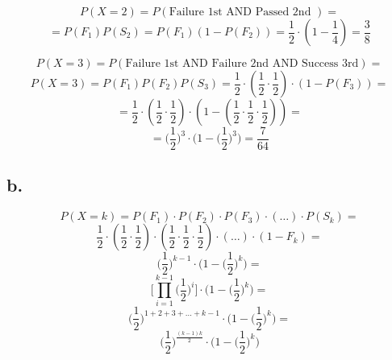 \documentclass{article}
\begin{document}
\begin{equation*}
    P(X = 2) = P(\mbox{Failure 1st AND Passed 2nd }) =
\end{equation*}
\begin{equation*}
    = P(F_{1})P(S_{2}) = P(F_{1})(1 - P(F_{2})) = \frac{1}{2} \cdot (1 - \frac{1}{4}) = \frac{3}{8}
\end{equation*}

\begin{equation*}
    P(X = 3) = P(\mbox{Failure 1st AND Failure 2nd AND Success 3rd}) =
\end{equation*}
\begin{equation*}
    P(X = 3) = P(F_{1})P(F_{2})P(S_{3}) = \frac{1}{2} \cdot (\frac{1}{2} \cdot \frac{1}{2}) \cdot (1 - P(F_{3})) =
\end{equation*}
\begin{equation*}
    = \frac{1}{2} \cdot (\frac{1}{2} \cdot \frac{1}{2}) \cdot (1 - (\frac{1}{2} \cdot \frac{1}{2} \cdot \frac{1}{2})) =
\end{equation*}
\begin{equation*}
    = \Big(\frac{1}{2}\Big)^{3} \cdot \Bigg( 1 - \Big(\frac{1}{2}\Big)^{3}\Bigg) = \frac{7}{64}
\end{equation*}

\subsection*{b.}

\begin{equation*}
    P(X=k) = P(F_{1}) \cdot P(F_{2}) \cdot P(F_{3}) \cdot (\dots) \cdot P(S_{k}) = 
\end{equation*}
\begin{equation*}
    \frac{1}{2} \cdot (\frac{1}{2} \cdot \frac{1}{2}) \cdot (\frac{1}{2} \cdot \frac{1}{2} \cdot \frac{1}{2}) \cdot (\dots) \cdot (1 - F_{k}) =
\end{equation*}
\begin{equation*}
    \Big(\frac{1}{2}\Big)^{k-1} \cdot \Bigg(1 - \Big(\frac{1}{2}\Big)^{k}\Bigg) =
\end{equation*}
\begin{equation*}
    \Bigg[\prod_{i=1}^{k-1} \Big(\frac{1}{2}\Big)^{i}\Bigg] \cdot \Bigg(1 - \Big(\frac{1}{2}\Big)^{k}\Bigg) =
\end{equation*}
\begin{equation*}
    \Big(\frac{1}{2}\Big)^{1 + 2 + 3 + \dots + k - 1} \cdot \Bigg(1 - \Big(\frac{1}{2}\Big)^{k}\Bigg) =
\end{equation*}
\begin{equation*}
    \Big(\frac{1}{2}\Big)^{\frac{(k-1)k}{2}} \cdot \Bigg(1 - \Big(\frac{1}{2}\Big)^{k}\Bigg)
\end{equation*}
\end{document}
